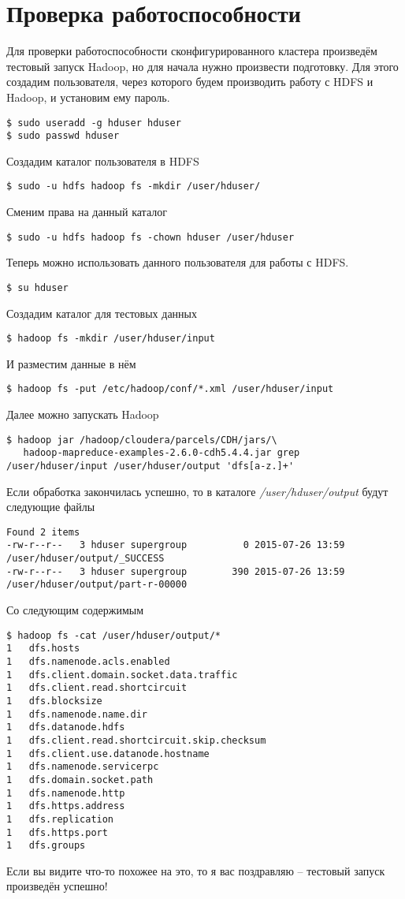 \section{Проверка работоспособности}
Для проверки работоспособности сконфигурированного кластера произведём тестовый запуск Hadoop, но для 
начала нужно произвести подготовку. Для этого создадим пользователя, через которого будем производить 
работу с HDFS и Hadoop, и установим ему пароль.
\begin{lstlisting}
$ sudo useradd -g hduser hduser
$ sudo passwd hduser
\end{lstlisting}
Создадим каталог пользователя в HDFS
\begin{lstlisting}
$ sudo -u hdfs hadoop fs -mkdir /user/hduser/
\end{lstlisting}
Сменим права на данный каталог
\begin{lstlisting}
$ sudo -u hdfs hadoop fs -chown hduser /user/hduser
\end{lstlisting}
Теперь можно использовать данного пользователя для работы с HDFS.
\begin{lstlisting}
$ su hduser
\end{lstlisting}
Создадим каталог для тестовых данных
\begin{lstlisting}
$ hadoop fs -mkdir /user/hduser/input
\end{lstlisting}
И разместим данные в нём
\begin{lstlisting}
$ hadoop fs -put /etc/hadoop/conf/*.xml /user/hduser/input 
\end{lstlisting}
Далее можно запускать Hadoop
\begin{lstlisting}
$ hadoop jar /hadoop/cloudera/parcels/CDH/jars/\
   hadoop-mapreduce-examples-2.6.0-cdh5.4.4.jar grep /user/hduser/input /user/hduser/output 'dfs[a-z.]+'
\end{lstlisting}
Если обработка закончилась успешно, то в каталоге \emph{/user/hduser/output} будут следующие файлы
\begin{lstlisting}
Found 2 items
-rw-r--r--   3 hduser supergroup          0 2015-07-26 13:59 /user/hduser/output/_SUCCESS
-rw-r--r--   3 hduser supergroup        390 2015-07-26 13:59 /user/hduser/output/part-r-00000
\end{lstlisting}
Со следующим содержимым
\begin{lstlisting}
$ hadoop fs -cat /user/hduser/output/*
1   dfs.hosts
1   dfs.namenode.acls.enabled
1   dfs.client.domain.socket.data.traffic
1   dfs.client.read.shortcircuit
1   dfs.blocksize
1   dfs.namenode.name.dir
1   dfs.datanode.hdfs
1   dfs.client.read.shortcircuit.skip.checksum
1   dfs.client.use.datanode.hostname
1   dfs.namenode.servicerpc
1   dfs.domain.socket.path
1   dfs.namenode.http
1   dfs.https.address
1   dfs.replication
1   dfs.https.port
1   dfs.groups
\end{lstlisting}
Если вы видите что-то похожее на это, то я вас поздравляю -- тестовый запуск произведён успешно!

